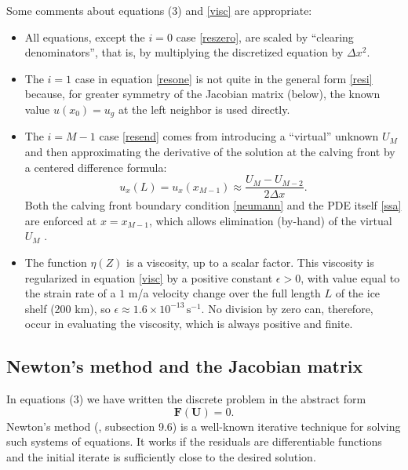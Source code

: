 \documentclass[11pt,final,reqno]{amsart}
\newcommand{\eps}{\epsilon}
\newcommand{\bbF}{\mathbf{F}}
\newcommand{\bU}{\mathbf{U}}
\begin{document}
Some comments about equations (3) and \eqref{visc} are appropriate:\begin{itemize}
\item All equations, except the $i=0$ case \eqref{reszero}, are scaled by ``clearing denominators'', that is, by multiplying the discretized equation by $\Delta x^2$.
\item The $i=1$ case in equation \eqref{resone} is not quite in the general form \eqref{resi} because, for greater symmetry of the Jacobian matrix (below), the known value $u(x_0)=u_g$ at the left neighbor is used directly.
\item The $i=M-1$ case \eqref{resend} comes from introducing a ``virtual'' unknown $U_{M}$ and then approximating the derivative of the solution at the calving front by a centered difference formula:
  $$u_x(L) = u_x(x_{M-1}) \approx \frac{U_M - U_{M-2}}{2\Delta x}.$$
Both the calving front boundary condition \eqref{neumann} and the PDE itself \eqref{ssa} are enforced at $x=x_{M-1}$, which allows elimination (by-hand) of the virtual $U_M$ \cite{MortonMayers}.
\item The function $\eta(Z)$ is a viscosity, up to a scalar factor.  This viscosity is regularized in equation \eqref{visc} by a positive constant $\eps>0$, with value equal to the strain rate of a $1$ m/a velocity change over the full length $L$ of the ice shelf (200 km), so $\eps \approx 1.6 \times 10^{-13}\,\text{s}^{-1}$.   No division by zero can, therefore, occur in evaluating the viscosity, which is always positive and finite.
\end{itemize}

\subsection*{Newton's method and the Jacobian matrix}   In equations (3) we have written the discrete problem in the abstract form
	$$\bbF(\bU) = 0.$$
Newton's method (\cite{Pressetal}, subsection 9.6) is a well-known iterative technique for solving such systems of equations.  It works if the residuals are differentiable functions and the initial iterate is sufficiently close to the desired solution.
\end{document}
